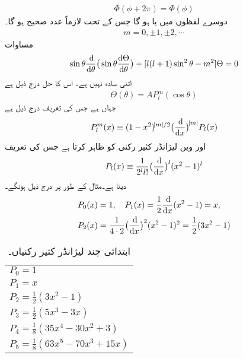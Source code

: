 \begin{align}
\Phi(\phi+2\pi)=\Phi(\phi) 
\end{align}
دوسرے لفظوں میں   یا  ہو گا جس کے تحت  لازماً عدد صحیح ہو گا۔
\begin{align}
m=0,\pm 1,\pm 2,\cdots
\end{align}
 مساوات  
\begin{align}\label{مساوات_ابعادی_تھیٹا_مساوات}
\sin{\theta}\frac{\dif}{\dif{\theta}}\big(\sin{\theta}\frac{\dif{\Theta}}{\dif{\theta}}\big)+[l(l+1)\sin^{2}{\theta}-m^{2}]\Theta=0 
\end{align}
اتنی سادہ نہیں ہے۔ اس کا حل درج ذیل ہے
\begin{align}
\Theta(\theta)=AP_{l}^{m}(\cos{\theta}) 
\end{align}
جہاں      ہے جس کی تعریف درج ذیل ہے
\begin{align}\label{مساوات_ابعادی_شریک_لیژانڈر_تفاعلات_تعریف}
P_{l}^{m}(x)\equiv (1-x^{2})^{\abs{m}/2}\big(\frac{\dif}{\dif{x}}\big)^{\abs{m}}P_{l}(x) 
\end{align}
اور  ویں لیژانڈر کثیر رکنی  کو     ظاہر کرتا ہے جس کی تعریف 
\begin{align}\label{مساوات_ابعادی_روڈریگیس}
P_{l}(x)\equiv\frac{1}{2^{l}l!}\big(\frac{\dif}{\dif{x}}\big)^{l}(x^{2}-1)^{l} 
\end{align}
دیتا ہے۔مثال کے طور پر درج ذیل ہونگے۔
\begin{align*}
P_{0}(x)&=1,\quad P_{1}(x)=\frac{1}{2}\frac{\dif}{\dif{x}}(x^{2}-1)=x ,\\
P_{2}(x)&=\frac{1}{4\cdot 2}\big(\frac{\dif}{\dif{x}}\big)^{2}(x^{2}-1)^{2}=\frac{1}{2}(3x^{2}-1) 
\end{align*}
%
\begin{table}
\caption{ابتدائی چند لیژانڈر کثیر رکنیاں۔}
\label{جدول_ابعاد_لیژانڈر_چند_ابتدائی}
\centering
\begin{tabular}{l}
$P_0=1$\\[0.25em]
$P_1=x$\\[0.25em]
$P_2=\frac{1}{2}(3x^2-1)$\\[0.25em]
$P_3=\frac{1}{2}(5x^3-3x)$\\[0.25em]
$P_4=\frac{1}{8}(35x^4-30x^2+3)$\\[0.25em]
$P_5=\frac{1}{8}(63x^5-70x^3+15x)$
\end{tabular}
\end{table}

